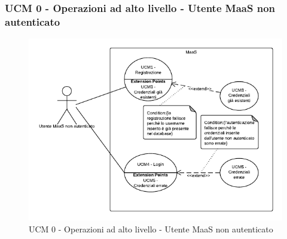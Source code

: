 \subsubsection{UCM 0 - Operazioni ad alto livello - Utente MaaS non autenticato} 
    \begin{figure}[H]
      \begin{center}
      \includegraphics[width=12cm]{UML/UCM 0 - Operazioni ad alto livello - Utente MaaS non autenticato.png}
      \caption{UCM 0 - Operazioni ad alto livello - Utente MaaS non autenticato}
      \end{center} 
    \end{figure}  
    
